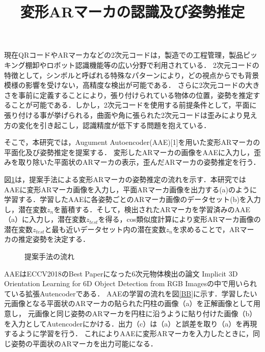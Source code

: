 \documentclass{jsarticle}
\title{変形ARマーカの認識及び姿勢推定}
\begin{document}
\maketitle

現在QRコードやARマーカなどの2次元コードは，製造での工程管理，製品ピッキング棚卸やロボット認識機能等の広い分野で利用されている．
2次元コードの特徴として，シンボルと呼ばれる特殊なパターンにより，どの視点からでも背景模様の影響を受けない，高精度な検出が可能である．
さらに2次元コードの大きさを事前に定義することにより，張り付けられている物体の位置，姿勢を推定することが可能である．しかし，2次元コードを使用する前提条件として，平面に張り付ける事が挙げられる，曲面や角に張られた2次元コードは歪みにより見え方の変化を引き起こし，認識精度が低下する問題を抱えている．

そこで，本研究では，Augument Autoencoder(AAE)[1]を用いた変形ARマーカの平面化及び姿勢推定を提案する．
変形したARマーカの画像をAAEに入力し，歪みを取り除いた平面状のARマーカの表示，歪んだARマーカの姿勢推定を行う．


図\ref{flow}は，提案手法による変形ARマーカの姿勢推定の流れを示す．本研究ではAAEに変形ARマーカ画像を入力し，平面ARマーカ画像を出力する(a)のように学習する．学習したAAEに各姿勢ごとのARマーカ画像のデータセット(b)を入力し，潜在変数$z_n$を蓄積する．そして，検出されたARマーカを学習済みのAAE（a）に入力し，潜在変数$z_{test}$を得る，cos類似度計算により変形ARマーカ画像の潜在変数$z_{test}$と最も近いデータセット内の潜在変数$z_n$を求めることで，ARマーカの推定姿勢を決定する．

\begin{figure}[ht]
\vspace{-5zh}
\setlength{\epsfxsize}{3cm}
\centerline{}
\vspace{8zh}
\caption{提案手法の流れ}
\label{flow}
\vspace{-1.0zh}
\end{figure}

AAEはECCV2018のBest Paperになった6次元物体検出の論文 Implicit 3D Orientation Learning for 6D Object Detection from RGB Imagesの中で用いられている拡張Autencoderである．
AAEの学習の流れを図\ref{BB}に示す．学習したい元画像となる平面状のARマーカの貼られた円柱の画像（a）を正解画像として用意し，
元画像と同じ姿勢のARマーカを円柱に沿うように貼り付けた画像（b）を入力としてAutencoderにかける．出力（c）は（a）と誤差を取り（a）を再現するように学習を行う．
これによりAAEに変形ARマーカを入力したときに，同じ姿勢の平面状のARマーカを出力可能になる．
\end{document}
